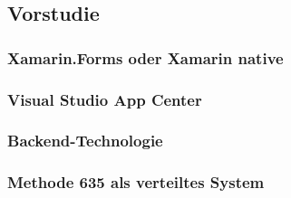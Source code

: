 \subsection{Vorstudie}

\subsubsection{Xamarin.Forms oder Xamarin native}

\subsubsection{Visual Studio App Center}

\subsubsection{Backend-Technologie}

\subsubsection{Methode 635 als verteiltes System}
